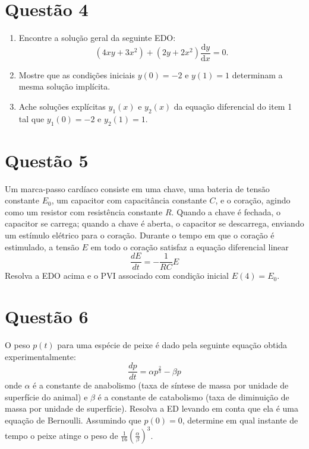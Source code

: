 \documentclass[oneside,12pt,a4paper]{article}
\begin{document}
    \section*{Questão 4}

    \begin{enumerate}
        \item Encontre a solução geral da seguinte EDO:
        $$
            (4xy+3x^2)+(2y+2x^2)\frac{\mathrm dy}{\mathrm dx}=0.
        $$

        \item Mostre que as condições iniciais $y(0)=-2$ e $y(1)=1$ determinam a mesma solução implícita.

        \item Ache soluções explícitas $y_1(x)$ e $y_2(x)$ da equação diferencial do item 1 tal que $y_1(0)=-2$ e $y_2(1)=1$. 
    \end{enumerate}

    \section*{Questão 5}
    Um marca-passo cardíaco consiste em uma chave, uma bateria de tensão constante $E_0$, um capacitor com capacitância constante $C$, e o coração, agindo como um resistor com resistência constante $R$. Quando a chave é fechada, o capacitor se carrega; quando a chave é aberta, o capacitor se descarrega, enviando um estímulo elétrico para o coração. Durante o tempo em que  o coração é estimulado, a tensão $E$ em todo o coração satisfaz a equação diferencial linear
    $$
        \frac{dE}{dt}=-\frac{1}{RC}E
    $$
    Resolva a EDO acima e o PVI associado com condição inicial $E(4)=E_0$.

    \section*{Questão 6}

    O peso $p(t)$ para uma espécie de peixe é dado pela seguinte equação obtida experimentalmente:
    $$
        \frac{dp}{dt}=\alpha p^\frac{2}{3}-\beta p
    $$
    onde $\alpha$ é a constante de anabolismo (taxa de síntese de massa por unidade de superfície do animal) e $\beta$ é a constante de catabolismo (taxa de diminuição de massa por unidade de superfície). Resolva a ED levando em conta que ela é uma equação de Bernoulli. Assumindo que $p(0)=0$, determine em qual instante de tempo o peixe atinge o peso de $\frac{1}{16}\left(\frac{\alpha}{\beta}\right)^3$.
\end{document}
